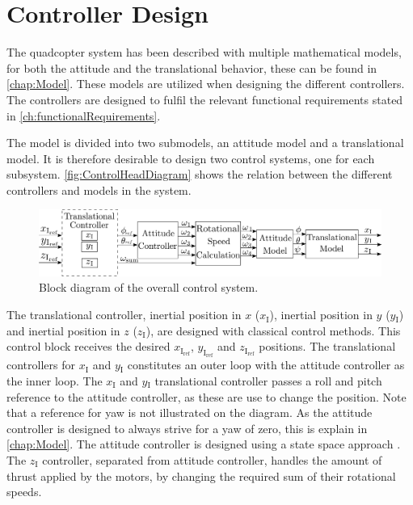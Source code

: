 \chapter{Controller Design}\label{chap:Control}
The quadcopter system has been described with multiple mathematical models, for both the attitude and the translational behavior, these can be found in \autoref{chap:Model}. These models are utilized when designing the different controllers. The controllers are designed to fulfil the relevant functional requirements stated in \autoref{ch:functionalRequirements}.

The model is divided into two submodels, an attitude model and a translational model. It is therefore desirable to design two control systems, one for each subsystem. \autoref{fig:ControlHeadDiagram} shows the relation between the different controllers and models in the system.

%
\begin{figure}[H]
	\centering
	\includegraphics[width=1 \textwidth]{figures/generalcontroldiagram2}
	\caption{Block diagram of the overall control system.}
	\label{fig:ControlHeadDiagram}
\end{figure}
%
The translational controller, inertial position in $x$ ($x\mathrm{_I}$), inertial position in $y$ ($y\mathrm{_I}$) and inertial position in $z$ ($z\mathrm{_I}$), are designed with classical control methods. This control block receives the desired $x_\mathrm{I_{ref}}$, $y_\mathrm{I_{ref}}$ and $z_\mathrm{I_{ref}}$ positions. The translational controllers for $x\mathrm{_I}$ and $y\mathrm{_I}$ constitutes an outer loop with the attitude controller as the inner loop. The $x\mathrm{_I}$ and $y\mathrm{_I}$ translational controller passes a roll and pitch reference to the attitude controller, as these are use to change the position. Note that a reference for yaw is not illustrated on the diagram. As the attitude controller is designed to always strive for a yaw of zero, this is explain in \autoref{chap:Model}. The attitude controller is designed using a state space approach \cite{ssReference}. The $z\mathrm{_I}$ controller, separated from attitude controller, handles the amount of thrust applied by the motors, by changing the required sum of their rotational speeds.

